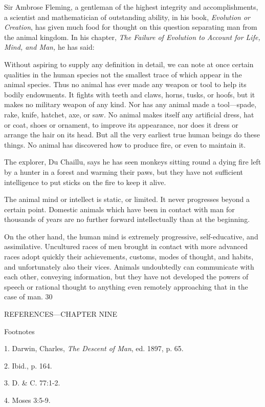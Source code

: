 Sir Ambrose Fleming, a gentleman of the highest integrity and accomplishments, a scientist
and mathematician of outstanding ability, in his book, \textit{Evolution or Creation}, has given much
food for thought on this question separating man from the animal kingdom. In his chapter,
\textit{The Failure of Evolution to Account for Life, Mind, and Man,} he has said:

Without aspiring to supply any definition in detail, we can note at once certain qualities in
the human species not the smallest trace of which appear in the animal species. Thus no
animal has ever made any weapon or tool to help its bodily endowments. It fights with teeth
and claws, horns, tusks, or hoofs, but it makes no military weapon of any kind. Nor has any
animal made a tool—spade, rake, knife, hatchet, axe, or saw. No animal makes itself any
artificial dress, hat or coat, shoes or ornament, to improve its appearance, nor does it dress or
arrange the hair on its head. But all the very earliest true human beings do these things. No
animal has discovered how to produce fire, or even to maintain it.

The explorer, Du Chaillu, says he has seen monkeys sitting round a dying fire left by a hunter
in a forest and warming their paws, but they have not sufficient intelligence to put sticks on
the fire to keep it alive.

The animal mind or intellect is static, or limited. It never progresses beyond a certain point.
Domestic animals which have been in contact with man for thousands of years are no further
forward intellectually than at the beginning.

On the other hand, the human mind is extremely progressive, self-educative, and
assimilative. Uncultured races of men brought in contact with more advanced races adopt
quickly their achievements, customs, modes of thought, and habits, and unfortunately also
their vices. Animals undoubtedly can communicate with each other, conveying information,
but they have not developed the powers of speech or rational thought to anything even
remotely approaching that in the case of man. 30

\newpage
REFERENCES—CHAPTER NINE

Footnotes

1. Darwin, Charles, \textit{The Descent of Man}, ed. 1897, p. 65.

2. Ibid., p. 164.

3. D. \& C. 77:1-2.

4. Moses 3:5-9.

